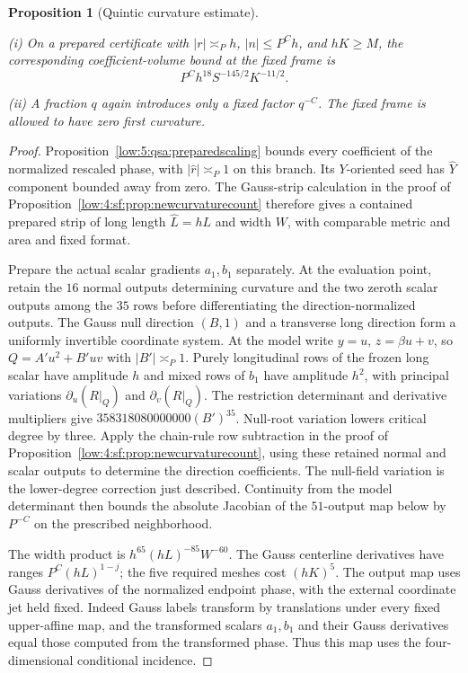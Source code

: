 \documentclass[11pt]{amsart}
\newtheorem{proposition}[theorem]{Proposition}
\theoremstyle{definition}
\theoremstyle{remark}
\numberwithin{equation}{section}
\begin{document}
\begin{proposition}[Quintic curvature estimate]\label{low:5:qsc:curvature}

\noindent\textup{(i)} On a prepared certificate with $|r|\asymp_Ph$, $|n|\le P^Ch$, and $hK\ge M$, the corresponding coefficient-volume bound at the fixed frame is
\[
 \boxed{\qquad P^Ch^{18}S^{-145/2}K^{-11/2}.\qquad}
\]

\noindent\textup{(ii)} A fraction $q$ again introduces only a fixed factor $q^{-C}$. The fixed frame is allowed to have zero first curvature.
\end{proposition}
\begin{proof}
Proposition~\ref{low:5:qsa:preparedscaling} bounds every coefficient of the normalized rescaled phase, with $|\widehat r|\asymp_P1$ on this branch. Its $Y$-oriented seed has $\widehat Y$ component bounded away from zero. The Gauss-strip calculation in the proof of Proposition~\ref{low:4:sf:prop:newcurvaturecount} therefore gives a contained prepared strip of long length $\widehat L=hL$ and width $W$, with comparable metric and area and fixed format.

Prepare the actual scalar gradients $a_1,b_1$ separately. At the evaluation point, retain the $16$ normal outputs determining curvature and the two zeroth scalar outputs among the $35$ rows before differentiating the direction-normalized outputs. The Gauss null direction $(B,1)$ and a transverse long direction form a uniformly invertible coordinate system. At the model write $y=u$, $z=\beta u+v$, so $Q=A'u^2+B'uv$ with $|B'|\asymp_P1$. Purely longitudinal rows of the frozen long scalar have amplitude $h$ and mixed rows of $b_1$ have amplitude $h^2$, with principal variations $\partial_u(R|_Q)$ and $\partial_v(R|_Q)$. The restriction determinant and derivative multipliers give $358318080000000(B')^{35}$. Null-root variation lowers critical degree by three. Apply the chain-rule row subtraction in the proof of Proposition~\ref{low:4:sf:prop:newcurvaturecount}, using these retained normal and scalar outputs to determine the direction coefficients. The null-field variation is the lower-degree correction just described. Continuity from the model determinant then bounds the absolute Jacobian of the $51$-output map below by $P^{-C}$ on the prescribed neighborhood.

The width product is $h^{65}(hL)^{-85}W^{-60}$. The Gauss centerline derivatives have ranges $P^C(hL)^{1-j}$; the five required meshes cost $(hK)^5$. The output map uses Gauss derivatives of the normalized endpoint phase, with the external coordinate jet held fixed. Indeed Gauss labels transform by translations under every fixed upper-affine map, and the transformed scalars $a_1,b_1$ and their Gauss derivatives equal those computed from the transformed phase. Thus this map uses the four-dimensional conditional incidence.


\end{proof}
\end{document}
